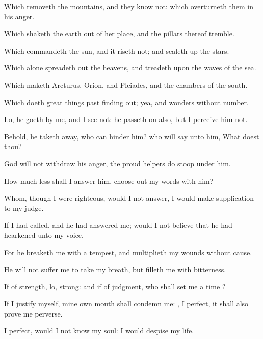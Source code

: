 {Which
removeth the
mountains, and they
know not: which
overturneth them in his
anger.

Which
shaketh the
earth out of her
place, and the
pillars thereof
tremble.

Which
commandeth the
sun, and it
riseth not; and sealeth
up the
stars.

Which alone spreadeth
out the
heavens, and
treadeth upon the
waves of the
sea.

Which
maketh
Arcturus,
Orion, and
Pleiades, and the
chambers of the
south.

Which
doeth great
things
past finding
out; yea, and
wonders without
number.

Lo, he
goeth by me, and I
see
{} not: he passeth
on also, but I
perceive him not.

Behold, he taketh
away, who can
hinder him? who will
say unto him, What
doest thou?

God will not
withdraw his
anger, the
proud
helpers do
stoop under him.


\par }{\PP {}How much less shall I
answer him,
{} choose
out my
words
{} with him?

Whom, though I were
righteous,
{} would I not
answer,
{} I would make
supplication to my
judge.

If I had
called, and he had
answered me;
{} would I not
believe that he had
hearkened unto my
voice.

For he
breaketh me with a
tempest, and
multiplieth my
wounds without
cause.

He will not
suffer me to
take my
breath, but
filleth me with
bitterness.

If
{} of
strength, lo,
{}
strong: and if of
judgment, who shall
set me a time
{}?

If I
justify myself, mine own
mouth shall
condemn me:
{}, I
{}
perfect, it shall also prove me
perverse.

 I
{}
perfect,
{} would I not
know my
soul: I would
despise my
life.


}
